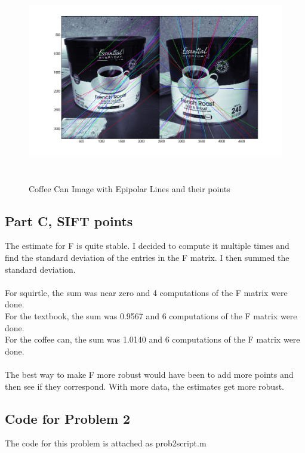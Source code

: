 \documentclass[11pt,psfig]{article}
\begin{document}
\begin{figure}[H]
\centering
\includegraphics[height=3.5in]{coffeeCan_prob2Epipolar2.png}
\caption{Coffee Can Image with Epipolar Lines and their points}
\label{p2h}
\end{figure}

\newpage

\subsection*{Part C, SIFT points}

The estimate for F is quite stable. I decided to compute it multiple times and find the standard deviation of the entries in the F matrix. I then summed the standard deviation. \\
\\
For squirtle, the sum was near zero and 4 computations of the F matrix were done.\\
For the textbook, the sum was 0.9567 and 6 computations of the F matrix were done.\\
For the coffee can, the sum was 1.0140 and 6 computations of the F matrix were done. \\
\\
The best way to make F more robust would have been to add more points and then see if they correspond. With more data, the estimates get more robust. 

\subsection*{Code for Problem 2}

The code for this problem is attached as prob2script.m
\end{document}
